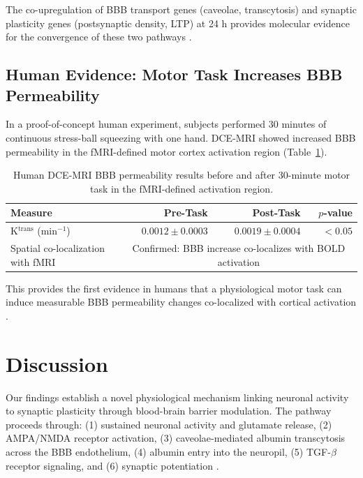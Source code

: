 \documentclass[11pt]{article}
\begin{document}
The co-upregulation of BBB transport genes (caveolae, transcytosis) and synaptic plasticity genes (postsynaptic density, LTP) at 24 h provides molecular evidence for the convergence of these two pathways \citep{love2009moderated, cacheaux2009transcriptome}.

\subsection{Human Evidence: Motor Task Increases BBB Permeability}

In a proof-of-concept human experiment, subjects performed 30 minutes of continuous stress-ball squeezing with one hand. DCE-MRI \citep{tofts1999estimating} showed increased BBB permeability in the fMRI-defined motor cortex activation region (Table~\ref{tab:human}).

\begin{table}[H]
\centering
\caption{Human DCE-MRI BBB permeability results before and after 30-minute motor task in the fMRI-defined activation region.}
\label{tab:human}
\begin{tabular}{lrrr}
\toprule
\textbf{Measure} & \textbf{Pre-Task} & \textbf{Post-Task} & \textbf{$p$-value} \\
\midrule
K$^\text{trans}$ (min$^{-1}$) & $0.0012 \pm 0.0003$ & $0.0019 \pm 0.0004$ & $<0.05$ \\
Spatial co-localization with fMRI & \multicolumn{3}{c}{Confirmed: BBB increase co-localizes with BOLD activation} \\
\bottomrule
\end{tabular}
\end{table}

This provides the first evidence in humans that a physiological motor task can induce measurable BBB permeability changes co-localized with cortical activation \citep{logothetis2001neurophysiological}.

\section{Discussion}

Our findings establish a novel physiological mechanism linking neuronal activity to synaptic plasticity through blood-brain barrier modulation. The pathway proceeds through: (1) sustained neuronal activity and glutamate release, (2) AMPA/NMDA receptor activation, (3) caveolae-mediated albumin transcytosis across the BBB endothelium, (4) albumin entry into the neuropil, (5) TGF-$\beta$ receptor signaling, and (6) synaptic potentiation \citep{andreone2017blood, ivens2007tgf, schachtrup2010fibrinogen}.
\end{document}
